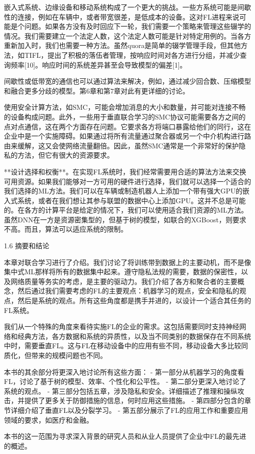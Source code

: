 嵌入式系统、边缘设备和移动系统构成了一个更大的挑战。一些方系统可能是间歇性的连接，例如在车辆中，或者带宽很差，是低成本的设备。这对FL进程来说可能是个问题。如果各方没有及时回应下一轮，我们需要一个策略来管理这些辍学的情况。我们需要建立一个法定人数，这个法定人数可能是针对特定用例的。当各方重新加入时，我们也需要一种方法。虽然quora是简单的辍学管理手段，但其他方法，如TIFL，提出了积极的落伍者管理，按响应时间对各方进行分组，并减少查询频率[10]。响应时间的系统差异甚至会导致模型的偏差[1]。

间歇性或低带宽的通信也可以通过算法来解决，例如，通过减少回合数、压缩模型和融合更多分歧的模型。第6章和第7章对此有更详细的讨论。

使用安全计算方法，如SMC，可能会增加消息的大小和数量，并可能对连接不畅的设备构成问题。此外，一些用于垂直联合学习的SMC协议可能需要各方之间的点对点通信，这在两个方面存在问题。它要求各方将端口暴露给他们的同行，这在企业中是一个实施障碍。如果通过将所有流量通过聚合器或另一个中介机构进行路由来缓解，这又会使网络流量翻倍。因此，虽然SMC通常是一个非常好的保护隐私的方法，但它有很大的资源要求。

**设计选择和权衡**。在实现FL系统时，我们经常需要用合适的算法方法来交换可用资源。如果我们能够对一方可用的硬件进行选择，我们就可以选择一个适合的我们选择的ML方法。我们可以在车辆或制造机器人上添加一个带有强大GPU的嵌入式系统，或者在我们想让其参与联盟的数据中心上添加GPU。这并不总是可能的。在各方的计算平台是给定的情况下，我们可以使用适合我们资源的ML方法。虽然DNN在一方是资源密集型的，但基于树的模型，如联合的XGBoost，则要求不高。而且，算法可以适应系统的限制。

1.6 摘要和结论

本章对联合学习进行了介绍。我们讨论了将训练带到数据上的主要动机，而不是像集中式ML那样将所有的数据集中起来。遵守隐私法规的需要，数据的保密性，以及网络质量等务实的考虑，是主要的驱动力。我们介绍了各方和聚合者的主要概念，然后通过我们需要考虑的FL的主要观点：机器学习的观点，安全和隐私的观点，然后是系统的观点。所有这些角度都是携手并进的，以设计一个适合其任务的FL系统。

我们从一个特殊的角度来看待实施FL的企业的需求。这包括需要同时支持神经网络和经典方法，各方数据和系统的异质性，以及当不同类别的数据保存在不同系统中时，需要垂直FL。这与FL在移动设备中的应用有些不同，移动设备大多比较同质化，但带来的规模问题也不同。

本书的其余部分将更深入地讨论所有这些方面：
- 第一部分从机器学习的角度看FL，讨论了基于树的模型、效率、个性化和公平性。
- 第二部分更深入地讨论了系统的观点。
- 第三部分包括五章，涉及隐私和安全。详细描述了推理和操纵攻击，并提供了更多关于防御措施的信息，何时应用这些措施。
- 第四部分包含的章节详细介绍了垂直FL以及分裂学习。
- 第五部分展示了FL的应用工作和重要应用领域的要求，如医疗和金融。

本书的这一范围为寻求深入背景的研究人员和从业人员提供了企业中FL的最先进的概述。

%
%